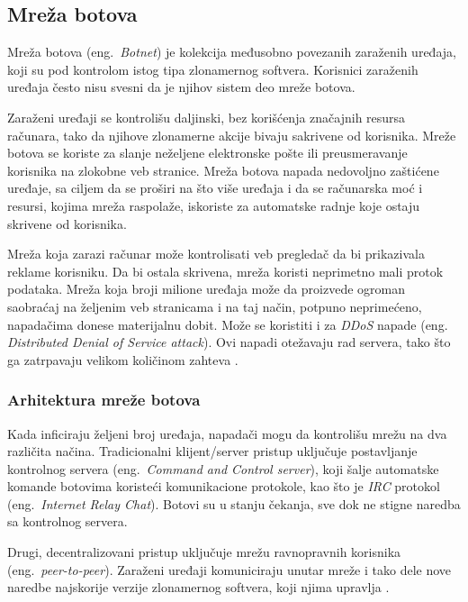 \documentclass[a4paper]{article}
\begin{document}
\subsection{Mreža botova}
\label{botnet}

Mreža botova (eng.~{\em Botnet}) je kolekcija 
međusobno povezanih zaraženih uređaja, koji su pod kontrolom istog tipa zlonamernog softvera. Korisnici zaraženih uređaja često nisu svesni da je njihov sistem deo mreže botova.

Zaraženi uređaji se kontrolišu daljinski, bez korišćenja značajnih resursa računara, tako da njihove zlonamerne akcije bivaju sakrivene od korisnika. Mreže botova se koriste za slanje neželjene elektronske pošte ili preusmeravanje korisnika na zlokobne veb stranice. Mreža botova napada nedovoljno zaštićene uređaje, sa ciljem da se proširi na što više uređaja i da se računarska moć i resursi, kojima mreža raspolaže, iskoriste za automatske radnje koje ostaju skrivene od korisnika.

Mreža koja zarazi računar može kontrolisati veb pregledač da bi prikazivala reklame korisniku. Da bi ostala skrivena, mreža koristi neprimetno mali protok podataka. Mreža koja broji milione uređaja može da proizvede ogroman saobraćaj na željenim veb stranicama i na taj način, potpuno neprimećeno, napadačima donese materijalnu dobit. Može se koristiti i za \textit{DDoS} napade (eng. \textit{Distributed Denial of Service attack}). Ovi napadi otežavaju rad servera, tako što ga zatrpavaju velikom količinom zahteva \cite{botnet}.

\subsubsection{Arhitektura mreže botova}

Kada inficiraju željeni broj uređaja, napadači mogu da kontrolišu mrežu na dva različita načina. Tradicionalni klijent/server pristup uključuje postavljanje kontrolnog servera (eng.~{\em Command and Control server}), koji šalje automatske komande botovima koristeći komunikacione protokole, kao što je \textit{IRC} protokol (eng.~{\em Internet Relay Chat}). Botovi su u stanju čekanja, sve dok ne stigne naredba sa kontrolnog servera.

Drugi, decentralizovani pristup uključuje mrežu ravnopravnih korisnika (eng.~{\em peer-to-peer}). Zaraženi uređaji komuniciraju unutar mreže i tako dele nove naredbe najskorije verzije zlonamernog softvera, koji njima upravlja \cite{botnet}.
\end{document}
